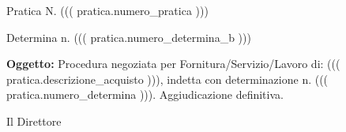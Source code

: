 \documentclass[a4paper,12pt]{letter}
\begin{document}
\topaddr

{\small Pratica N. ((( pratica.numero_pratica ))) }
\vspace{1cm}

\begin{flushright}

Determina n. ((( pratica.numero_determina_b )))
\end{flushright}

{\bf Oggetto:} Procedura negoziata per  Fornitura/Servizio/Lavoro di: ((( pratica.descrizione_acquisto ))),
indetta con determinazione  n. ((( pratica.numero_determina ))). Aggiudicazione definitiva.

\begin{center}
Il Direttore
\end{center}

\vspace{0.5 cm}
\end{document}
